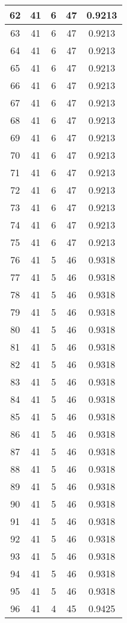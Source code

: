 \documentclass[letterpaper, 12pt]{article}
\begin{document}
\begin{longtable}{|c|c|c|c|c|}
\hline
62 & 41 & 6 & 47 & 0.9213 \\
\hline
63 & 41 & 6 & 47 & 0.9213 \\
\hline
64 & 41 & 6 & 47 & 0.9213 \\
\hline
65 & 41 & 6 & 47 & 0.9213 \\
\hline
66 & 41 & 6 & 47 & 0.9213 \\
\hline
67 & 41 & 6 & 47 & 0.9213 \\
\hline
68 & 41 & 6 & 47 & 0.9213 \\
\hline
69 & 41 & 6 & 47 & 0.9213 \\
\hline
70 & 41 & 6 & 47 & 0.9213 \\
\hline
71 & 41 & 6 & 47 & 0.9213 \\
\hline
72 & 41 & 6 & 47 & 0.9213 \\
\hline
73 & 41 & 6 & 47 & 0.9213 \\
\hline
74 & 41 & 6 & 47 & 0.9213 \\
\hline
75 & 41 & 6 & 47 & 0.9213 \\
\hline
76 & 41 & 5 & 46 & 0.9318 \\
\hline
77 & 41 & 5 & 46 & 0.9318 \\
\hline
78 & 41 & 5 & 46 & 0.9318 \\
\hline
79 & 41 & 5 & 46 & 0.9318 \\
\hline
80 & 41 & 5 & 46 & 0.9318 \\
\hline
81 & 41 & 5 & 46 & 0.9318 \\
\hline
82 & 41 & 5 & 46 & 0.9318 \\
\hline
83 & 41 & 5 & 46 & 0.9318 \\
\hline
84 & 41 & 5 & 46 & 0.9318 \\
\hline
85 & 41 & 5 & 46 & 0.9318 \\
\hline
86 & 41 & 5 & 46 & 0.9318 \\
\hline
87 & 41 & 5 & 46 & 0.9318 \\
\hline
88 & 41 & 5 & 46 & 0.9318 \\
\hline
89 & 41 & 5 & 46 & 0.9318 \\
\hline
90 & 41 & 5 & 46 & 0.9318 \\
\hline
91 & 41 & 5 & 46 & 0.9318 \\
\hline
92 & 41 & 5 & 46 & 0.9318 \\
\hline
93 & 41 & 5 & 46 & 0.9318 \\
\hline
94 & 41 & 5 & 46 & 0.9318 \\
\hline
95 & 41 & 5 & 46 & 0.9318 \\
\hline
96 & 41 & 4 & 45 & 0.9425 \\

\end{longtable}
\end{document}
